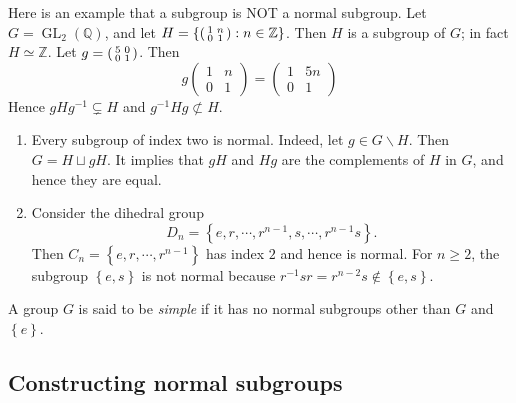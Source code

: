 \begin{example}
  Here is an example that a subgroup is NOT a normal subgroup. Let \( G =
  \operatorname{GL}_2(\mathbb{Q}) \), and let \( H = \left\lbrace
    \begin{psmallmatrix}
      1 &n\\0 &1
  \end{psmallmatrix}: n \in \mathbb{Z} \right\rbrace \). Then \( H \) is a
  subgroup of \( G \); in fact \( H \simeq \mathbb{Z} \). Let \( g =
  \begin{psmallmatrix}
    5 & 0\\0 & 1
  \end{psmallmatrix} \).
  Then
  \[
    g \begin{pmatrix}
      1 &n \\0 &1
    \end{pmatrix} = \begin{pmatrix}
      1 &5n\\ 0 &1
    \end{pmatrix}
  \]
  Hence \( g H g^{-1} \subsetneq H \) and \( g^{-1}Hg \not\subset H \).
\end{example}


\begin{example}
  \begin{enumerate}
    \item Every subgroup of index two is normal.
      Indeed, let \( g \in G \backslash H \).
      Then \( G = H \sqcup gH \).
      It implies that \( gH \) and \( Hg \) are the complements of \( H \) in \( G \), and hence they are equal.
    \item Consider the dihedral group
      \[
        D_n = \left\lbrace e, r, \cdots, r^{n - 1}, s, \cdots,r^{n - 1}s \right\rbrace.
      \]
      Then \( C_n = \left\lbrace e, r, \cdots, r^{n - 1} \right\rbrace \) has index \( 2 \) and hence is normal.
      For \( n \geq 2 \), the subgroup \( \left\lbrace e, s \right\rbrace \) is not normal because \( r^{-1}sr = r^{n - 2}s \notin \left\lbrace e, s \right\rbrace \).
  \end{enumerate}
\end{example}

\begin{definition}
  A group \( G \) is said to be \emph{simple} if it has no normal subgroups
  other than \( G \) and \( \left\lbrace e \right\rbrace \).
\end{definition}

\subsection{Constructing normal subgroups}

